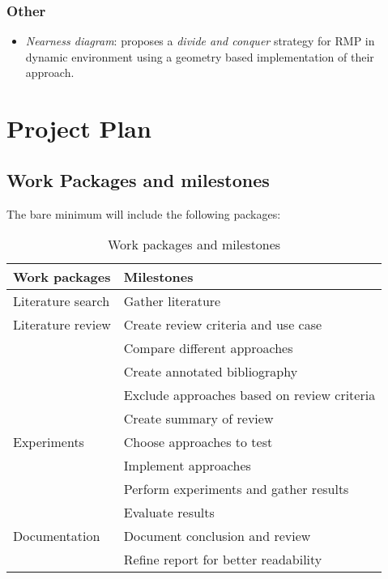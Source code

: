 \documentclass[rnd]{mas_proposal}
\begin{document}
\subsection{Other}
\begin{itemize}
    \item \textit{Nearness diagram}: \cite{minguez2004nearness} proposes a \textit{divide and conquer} strategy for RMP in dynamic environment using a geometry based implementation of their approach.
\end{itemize}


\chapter{Project Plan}

\section{Work Packages and milestones}
The bare minimum will include the following packages:
\begin{table}[ht!]
    \centering
    \begin{tabular}{|l|l|}
        \hline
        \textbf{Work packages} & \textbf{Milestones} \\\hline
        Literature search   & Gather literature \\\hline
        Literature review   & Create review criteria and use case \\
                            & Compare different approaches \\
                            & Create annotated bibliography \\ 
                            & Exclude approaches based on review criteria \\ 
                            & Create summary of review \\\hline
        Experiments         & Choose approaches to test \\
                            & Implement approaches\\ 
                            & Perform experiments and gather results \\ 
                            & Evaluate results \\\hline 
        Documentation       & Document conclusion and review \\
                            & Refine report for better readability \\\hline 
    
    \end{tabular}
    \caption{Work packages and milestones\label{tab:workpackagesandmilestones}}
\end{table}
\end{document}

